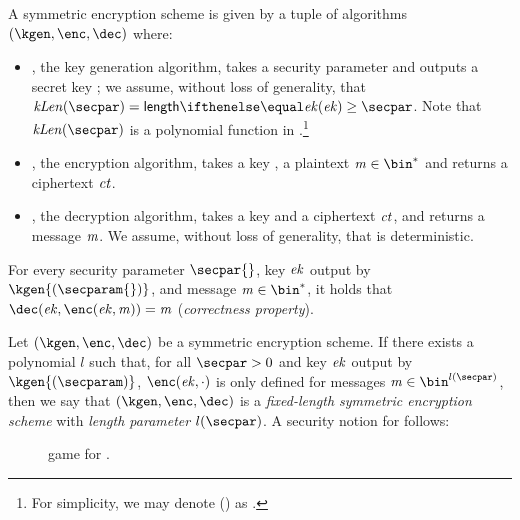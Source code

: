\begin{definition}
    A symmetric encryption scheme \sym{} is given by a tuple of \ppt{} algorithms $(\kgen,\enc, \dec)$ where:
\begin{itemize}
    \item \kgen{}, the key generation algorithm, takes a security parameter \secparam{} and outputs a secret key \ek; we assume, without loss of generality, that $\symKeyLen (\secpar) = \len{\ek}\geq \secpar$. Note that $\symKeyLen(\secpar)$ is a polynomial function in \secpar.\footnote{For simplicity, we may denote \symKeyLen(\secpar) as \symKeyLen{}.}
    \item \enc{}, the encryption algorithm, takes a key \ek{}, a plaintext $\msg\in\bin^{*}$ and returns a ciphertext $\mathit{ct}$.
    \item \dec{}, the decryption algorithm, takes a key \ek{} and a ciphertext $\mathit{ct}$, and returns a message $\mathit{m}$. We assume, without loss of generality, that \dec{} is deterministic.
\end{itemize}
    For every security parameter $\secpar{}$, key $\mathit{ek}$ output by $\kgen{(\secparam{})}$, and message $\msg \in \bin^{*}$, it holds that $\dec(\ek, \enc(\ek, \msg)) = \msg$ (\emph{correctness property}).
\end{definition}

Let $(\kgen,\enc, \dec)$ be a symmetric encryption scheme. If there exists a polynomial $l$ such that, for all $\secpar > 0$ and key $\mathit{ek}$ output by $\kgen{(\secparam)}$, $\enc(\ek, \cdot)$ is only defined for messages $\msg\in\bin^{l(\secpar)}$, then we say that $(\kgen,\enc,\dec)$ is a \emph{fixed-length symmetric encryption scheme} with \emph{length parameter} $l(\secpar)$. A security notion for \sym{} follows:

\begin{figure}[h!]
    \centering
    \caption{\indcpa{} game for \sym.}\label{fig:indcpa}
\end{figure}

